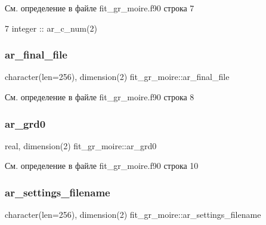 См. определение в файле fit\+\_\+gr\+\_\+moire.\+f90 строка 7


\begin{DoxyCode}
7 integer                 :: ar\_c\_num(2)
\end{DoxyCode}
\mbox{\label{namespacefit__gr__moire_a1e26c6ce1c81e9f34f2f2edd4fd40ae4}} 
\subsubsection{\texorpdfstring{ar\+\_\+final\+\_\+file}{ar\_final\_file}}
{\footnotesize\ttfamily character(len=256), dimension(2) fit\+\_\+gr\+\_\+moire\+::ar\+\_\+final\+\_\+file}



См. определение в файле fit\+\_\+gr\+\_\+moire.\+f90 строка 8

\mbox{\label{namespacefit__gr__moire_a133d6649efb184d364f20a02e2afd05f}} 
\subsubsection{\texorpdfstring{ar\+\_\+grd0}{ar\_grd0}}
{\footnotesize\ttfamily real, dimension(2) fit\+\_\+gr\+\_\+moire\+::ar\+\_\+grd0}



См. определение в файле fit\+\_\+gr\+\_\+moire.\+f90 строка 10

\mbox{\label{namespacefit__gr__moire_abe61efd3e06474bc596014a35475150c}} 
\subsubsection{\texorpdfstring{ar\+\_\+settings\+\_\+filename}{ar\_settings\_filename}}
{\footnotesize\ttfamily character(len=256), dimension(2) fit\+\_\+gr\+\_\+moire\+::ar\+\_\+settings\+\_\+filename}



